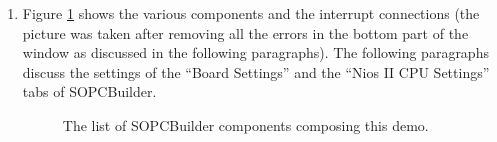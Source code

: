\begin{enumerate}
\item Figure \ref{fig:tutorial_sopcbuilder_final} shows the various
  components and the interrupt connections (the picture was taken
  after removing all the errors in the bottom part of the window as
  discussed in the following paragraphs). The following paragraphs
  discuss the settings of the ``Board Settings'' and the ``Nios II CPU
  Settings'' tabs of SOPCBuilder.
%
\begin{figure}

\caption{\label{fig:tutorial_sopcbuilder_final}The list of SOPCBuilder
components composing this demo.}
\end{figure}


\end{enumerate}

